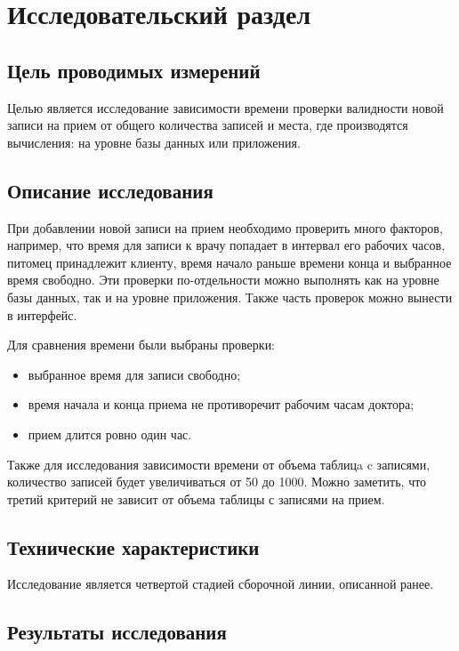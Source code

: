 \section{Исследовательский раздел}


\subsection{Цель проводимых измерений}

Целью является исследование зависимости времени проверки валидности новой записи на прием от общего количества записей и места, где производятся вычисления: на уровне базы данных или приложения.

\subsection{Описание исследования}

При добавлении новой записи на прием необходимо проверить много факторов, например, что время для записи к врачу попадает в интервал его рабочих часов, питомец принадлежит клиенту, время начало раньше времени конца и выбранное время свободно. Эти проверки по-отдельности можно выполнять как на уровне базы данных, так и на уровне приложения. Также часть проверок можно вынести в интерфейс.

Для сравнения времени были выбраны проверки:
\begin{itemize}[label*=---]
	\item выбранное время для записи свободно;
	\item время начала и конца приема не противоречит рабочим часам доктора;
	\item прием длится ровно один час.
\end{itemize}

Также для исследования зависимости времени от объема таблицa c записями, количество записей будет увеличиваться от 50 до 1000. Можно заметить, что третий критерий не зависит от объема таблицы с записями на прием.

\subsection{Технические характеристики}

Исследование является четвертой стадией сборочной линии, описанной ранее. 

\subsection{Результаты исследования}
